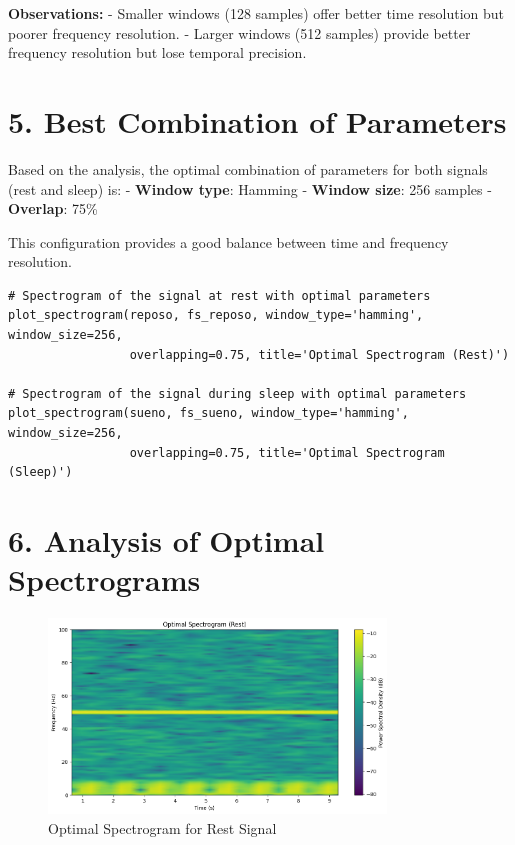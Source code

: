 \documentclass[10pt]{article}
\theoremstyle{definition}
\theoremstyle{remark}
\theoremstyle{definition}
\numberwithin{equation}{prob}
\begin{document}
\textbf{Observations:}
- Smaller windows (128 samples) offer better time resolution but poorer frequency resolution.
- Larger windows (512 samples) provide better frequency resolution but lose temporal precision.

\section*{5. Best Combination of Parameters}

Based on the analysis, the optimal combination of parameters for both signals (rest and sleep) is:
- \textbf{Window type}: Hamming
- \textbf{Window size}: 256 samples
- \textbf{Overlap}: 75\%

This configuration provides a good balance between time and frequency resolution.

\begin{lstlisting}[caption=Python code for optimal spectrogram generation]
# Spectrogram of the signal at rest with optimal parameters
plot_spectrogram(reposo, fs_reposo, window_type='hamming', window_size=256,
                 overlapping=0.75, title='Optimal Spectrogram (Rest)')

# Spectrogram of the signal during sleep with optimal parameters
plot_spectrogram(sueno, fs_sueno, window_type='hamming', window_size=256,
                 overlapping=0.75, title='Optimal Spectrogram (Sleep)')
\end{lstlisting}

\section*{6. Analysis of Optimal Spectrograms}

\begin{figure}[h]
    \centering
    \includegraphics[width=0.8\textwidth]{./figures/Optimal Spectrogram (Rest).png}
    \caption{Optimal Spectrogram for Rest Signal}
\end{figure}
\end{document}
